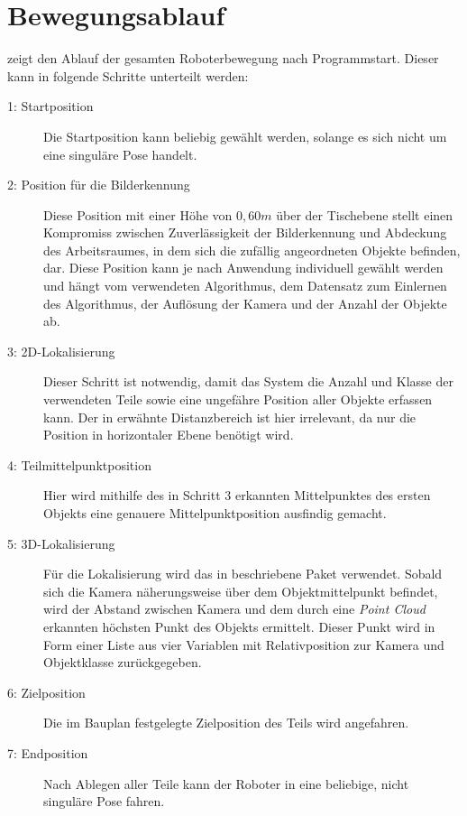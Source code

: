 \section{Bewegungsablauf}

 zeigt den Ablauf der gesamten Roboterbewegung nach Programmstart. Dieser kann in folgende Schritte unterteilt werden:

\begin{description}
    \item[1: Startposition] \beh Die Startposition kann beliebig gewählt werden, solange es sich nicht um eine singuläre Pose handelt.
    \item[2: Position für die Bilderkennung] Diese Position mit einer Höhe von $0,60m$ über der Tischebene stellt einen Kompromiss zwischen Zuverlässigkeit der Bilderkennung und Abdeckung des Arbeitsraumes, in dem sich die zufällig angeordneten Objekte befinden, dar. Diese Position kann je nach Anwendung individuell gewählt werden und hängt vom verwendeten Algorithmus, dem Datensatz zum Einlernen des Algorithmus, der Auflösung der Kamera und der Anzahl der Objekte ab.
    \item[3: 2D-Lokalisierung] Dieser Schritt ist notwendig, damit das System die Anzahl und Klasse der verwendeten Teile sowie eine ungefähre Position aller Objekte erfassen kann. Der in  erwähnte Distanzbereich ist hier irrelevant, da nur die Position in horizontaler Ebene benötigt wird.
    \item[4: Teilmittelpunktposition] \beh Hier wird mithilfe des in Schritt 3 erkannten Mittelpunktes des ersten Objekts eine genauere Mittelpunktposition ausfindig gemacht.
    \item[5: 3D-Lokalisierung] Für die Lokalisierung wird das in  beschriebene Paket verwendet. Sobald sich die Kamera näherungsweise über dem Objektmittelpunkt befindet, wird der Abstand zwischen Kamera und dem durch eine \textit{Point Cloud} erkannten höchsten Punkt des Objekts ermittelt. Dieser Punkt wird in Form einer Liste aus vier Variablen mit Relativposition zur Kamera und Objektklasse zurückgegeben.
    \item[6: Zielposition] \beh Die im Bauplan festgelegte Zielposition des Teils wird angefahren.
    \item[7: Endposition] Nach Ablegen aller Teile kann der Roboter in eine beliebige, nicht singuläre Pose fahren.
\end{description}


